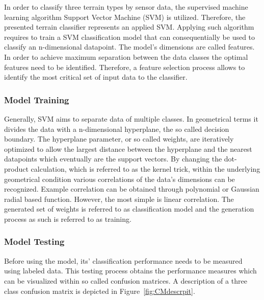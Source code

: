 \documentclass{article}
\begin{document}
In order to classify three terrain types by sensor data, the supervised machine learning algorithm Support Vector Machine (SVM) is utilized. Therefore, the presented terrain classifier represents an applied SVM. Applying such algorithm requires to train a SVM classification model that can consequentially be used to classify an n-dimensional datapoint.
The model's dimensions are called features. In order to achieve maximum separation between the data classes the optimal features need to be identified. Therefore, a feature selection process allows to identify the most critical set of input data to the classifier. 

\subsubsection{Model Training}
Generally, SVM aims to separate data of multiple classes. In geometrical terms it divides the data with a n-dimensional hyperplane, the so called decision boundary. The hyperplane parameter, or so called weights, are iteratively optimized to allow the largest distance between the hyperplane and the nearest datapoints which eventually are the support vectors.  
By changing the dot-product calculation, which is referred to as the kernel trick, within the underlying geometrical condition various correlations of the data's dimensions can be recognized. Example correlation can be obtained through polynomial or Gaussian radial based function. However, the most simple is linear correlation.
The generated set of weights is referred to as classification model and the generation process as such is referred to as training.\cite{kuhr2021}



\subsubsection{Model Testing}
Before using the model, its' classification performance needs to be measured using labeled data. This testing process obtains the performance measures which can be visualized within so called confusion matrices. A description of a three class confusion matrix is depicted in Figure~\ref{fig:CMdescrpit}.\cite{kuhr2021}
\end{document}
